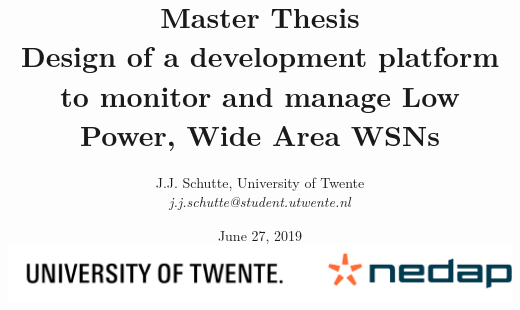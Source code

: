\documentclass[a4paper, 10pt, conference]{report}
\begin{document}
\author{J.J. Schutte, University of Twente\\\emph{j.j.schutte@student.utwente.nl}}
\date{June 27, 2019 \\ \vspace{26em} \includegraphics[width=\textwidth ,center]{resources/img/logos.png}}
\title{\textbf{Master Thesis} \\Design of a development platform to monitor and manage Low Power, Wide Area WSNs
}
\maketitle

\end{document}
